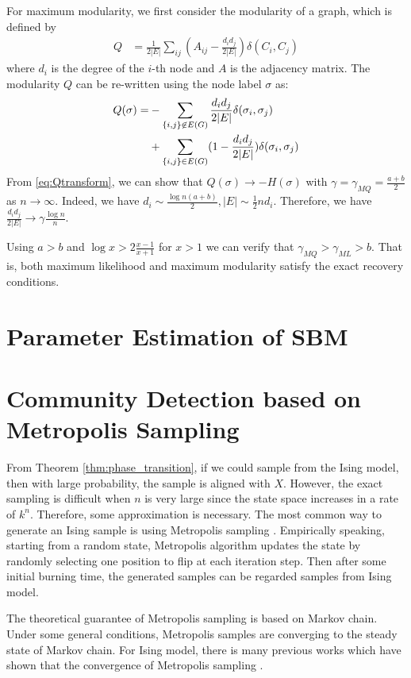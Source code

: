 \documentclass[journal]{IEEEtran}
\newcommand{\1}{\mathbbm{1}}
\begin{document}
For maximum modularity, we first consider the modularity of a graph, which is defined by
\begin{align}\label{eq:Q}
Q &= \frac{1}{2 |E|} \sum_{ij} (A_{ij} - \frac{d_i d_j}{2 |E|}) \delta(C_i, C_j)
\end{align}
where $d_i$ is the degree of the $i$-th node and $A$ is the adjacency matrix.
The modularity $Q$ can be re-written using the node label $\sigma$ as:
\begin{align}
Q(\sigma) = &-\sum_{\{i,j\} \not\in E(G) } \frac{d_i d_j}{2 |E|}\delta(\sigma_i,\sigma_j) \notag \\
&+ \sum_{\{i,j\} \in E(G) } (1 - \frac{d_i d_j}{2 |E|}) \delta(\sigma_i,\sigma_j)  \label{eq:Qtransform}
\end{align}
From \eqref{eq:Qtransform}, we can show that $Q(\sigma) \to -H(\sigma)$ with $\gamma = \gamma_{MQ} = \frac{a+b}{2}$ as $n\to \infty$.
Indeed, we have $d_i \sim \frac{\log n(a+b)}{2}, |E| \sim \frac{1}{2}n d_i$. Therefore, we have $\frac{d_id_j}{2|E|} \to \gamma \frac{\log n}{n} $.

Using $a>b$ and $\log x > 2 \frac{x-1}{x+1}$ for $x>1$ we can verify that $\gamma_{MQ} > \gamma_{ML} > b$. That is, both maximum likelihood and maximum modularity satisfy the exact recovery conditions.

\section{Parameter Estimation of SBM}\label{sec:psbm}
\section{Community Detection based on Metropolis Sampling}\label{sec:ms}
From Theorem \ref{thm:phase_transition}, if we could sample from the Ising model, then with large probability, the sample
is aligned with $X$. However, the exact sampling is difficult when $n$ is very large since the state space increases in
a rate of $k^n$. Therefore, some approximation is
necessary. The most common way to generate an Ising sample is using Metropolis sampling \cite{metropolis1953equation}. 
Empirically speaking, starting from a random state, Metropolis algorithm updates the state by randomly selecting one position to flip at each iteration step.
Then after some initial burning time, the generated samples can be regarded samples from Ising model.

The theoretical guarantee of Metropolis sampling is based on Markov chain. Under some general conditions, Metropolis samples are converging to
the steady state of Markov chain. For Ising model, there is many previous works which have shown that
the convergence of Metropolis sampling \cite{diaconis1998we}.
\end{document}
